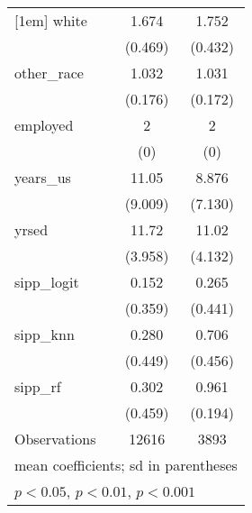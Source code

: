 \begin{table}[htbp]
\begin{tabular}{l*{2}{c}}
[1em]
white               &       1.674         &       1.752         \\
                    &     (0.469)         &     (0.432)         \\
[1em]
other\_race          &       1.032         &       1.031         \\
                    &     (0.176)         &     (0.172)         \\
[1em]
employed            &           2         &           2         \\
                    &         (0)         &         (0)         \\
[1em]
years\_us            &       11.05         &       8.876         \\
                    &     (9.009)         &     (7.130)         \\
[1em]
yrsed               &       11.72         &       11.02         \\
                    &     (3.958)         &     (4.132)         \\
[1em]
sipp\_logit          &       0.152         &       0.265         \\
                    &     (0.359)         &     (0.441)         \\
[1em]
sipp\_knn            &       0.280         &       0.706         \\
                    &     (0.449)         &     (0.456)         \\
[1em]
sipp\_rf             &       0.302         &       0.961         \\
                    &     (0.459)         &     (0.194)         \\
\hline
Observations        &       12616         &        3893         \\
\hline\hline
\multicolumn{3}{l}{\footnotesize mean coefficients; sd in parentheses}\\
\multicolumn{3}{l}{\footnotesize \sym{*} \(p<0.05\), \sym{**} \(p<0.01\), \sym{***} \(p<0.001\)}\\
\end{tabular}
\end{table}

